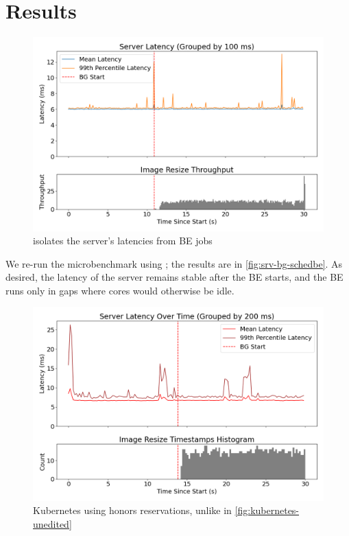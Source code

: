 \section{Results}

\begin{figure}[t]
    \centering
    \includegraphics[width=\columnwidth]{graphs/srv-bg-schedbe-low.png}
    \caption{ \beclass{} isolates the server's latencies from BE
     jobs}\label{fig:srv-bg-schedbe}
\end{figure}

We re-run the microbenchmark using \beclass{}; the results are in
\autoref{fig:srv-bg-schedbe}. As desired, the latency of the server remains
stable after the BE starts, and the BE runs only in gaps where cores would
otherwise be idle.

\begin{figure}[t]
    \centering
    \includegraphics[width=\columnwidth]{graphs/kubernetes-schedbe.png}
    \caption{ Kubernetes using \beclass{} honors reservations, unlike in
    \autoref{fig:kubernetes-unedited} }\label{fig:kubernetes-schedbe}
\end{figure}

